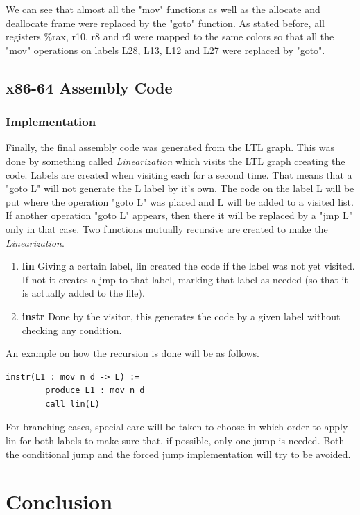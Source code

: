 \documentclass[conference]{IEEEtran}
\theoremstyle{definition}
\begin{document}
We can see that almost all the "mov" functions as well as the allocate and deallocate frame were replaced by the "goto" function. 
As stated before, all registers \%rax, r10, r8 and r9 were mapped to the same colors so that all the "mov" operations on labels L28, L13, L12 and L27 were replaced by "goto".

\subsection{x86-64 Assembly Code}
\subsubsection{Implementation}
Finally, the final assembly code was generated from the LTL graph. This was done by something called \textit{Linearization} which visits the LTL graph creating the code.
Labels are created when visiting each for a second time. That means that a "goto L" will not generate the L label by it's own. The code on the label L will be put where the operation "goto L" was placed and L will be added to a visited list. If another operation "goto L" appears, then there it will be replaced by a "jmp L" only in that case.
Two functions mutually recursive are created to make the \textit{Linearization}.

\begin{enumerate}
	\item \textbf{lin} Giving a certain label, lin created the code if the label was not yet visited. If not it creates a jmp to that label, marking that label as needed (so that it is actually added to the file).
	\item \textbf{instr} Done by the visitor, this generates the code by a given label without checking any condition.
\end{enumerate}

An example on how the recursion is done will be as follows.
\begin{lstlisting}
instr(L1 : mov n d -> L) := 	
		produce L1 : mov n d
		call lin(L)
\end{lstlisting}

For branching cases, special care will be taken to choose in which order to apply lin for both labels to make sure that, if possible, only one jump is needed. Both the conditional jump and the forced jump implementation will try to be avoided.

\section{Conclusion}
\end{document}
